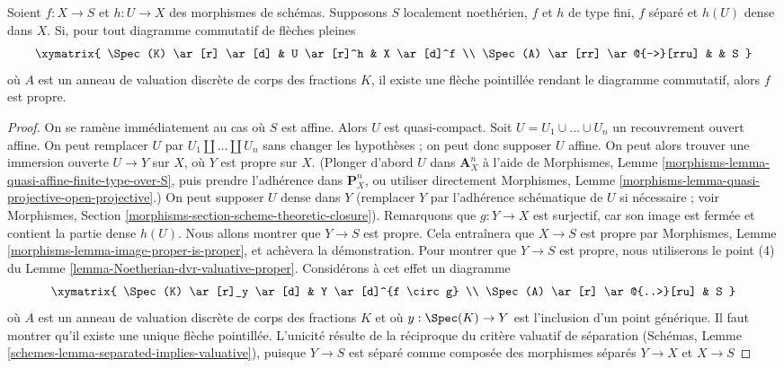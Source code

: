 \begin{lemma}
\label{lemma-refined-valuative-criterion-proper}
Soient $f : X \to S$ et $h : U \to X$ des morphismes de schémas.
Supposons $S$ localement noethérien, $f$ et $h$ de type fini,
$f$ séparé et $h(U)$ dense dans $X$.
Si, pour tout diagramme commutatif de flèches pleines
$$
\xymatrix{
\Spec(K) \ar[r] \ar[d] & U \ar[r]^h & X \ar[d]^f \\
\Spec(A) \ar[rr] \ar@{-->}[rru] & & S
}
$$
où $A$ est un anneau de valuation discrète de corps des fractions $K$,
il existe une flèche pointillée rendant le diagramme commutatif, alors $f$ est propre.
\end{lemma}

\begin{proof}
On se ramène immédiatement au cas où $S$ est affine.
Alors $U$ est quasi-compact.
Soit $U = U_1 \cup \ldots \cup U_n$ un recouvrement ouvert affine.
On peut remplacer $U$ par $U_1 \amalg \ldots \amalg U_n$ sans
changer les hypothèses ; on peut donc supposer $U$ affine.
On peut alors trouver une immersion ouverte $U \to Y$ sur $X$,
où $Y$ est propre sur $X$. (Plonger d'abord $U$ dans $\mathbf{A}^n_X$
à l'aide de Morphismes, Lemme \ref{morphisms-lemma-quasi-affine-finite-type-over-S},
puis prendre l'adhérence dans $\mathbf{P}^n_X$, ou utiliser directement
Morphismes, Lemme \ref{morphisms-lemma-quasi-projective-open-projective}.)
On peut supposer $U$ dense dans $Y$ (remplacer $Y$ par l'adhérence schématique
de $U$ si nécessaire ; voir Morphismes, Section
\ref{morphisms-section-scheme-theoretic-closure}).
Remarquons que $g : Y \to X$ est surjectif, car son image est fermée
et contient la partie dense $h(U)$.
Nous allons montrer que $Y \to S$ est propre. Cela entraînera que
$X \to S$ est propre par
Morphismes, Lemme \ref{morphisms-lemma-image-proper-is-proper},
et achèvera la démonstration.
Pour montrer que $Y \to S$ est propre, nous utiliserons
le point (4) du Lemme \ref{lemma-Noetherian-dvr-valuative-proper}.
Considérons à cet effet un diagramme
$$
\xymatrix{
\Spec(K) \ar[r]_y \ar[d] & Y \ar[d]^{f \circ g} \\
\Spec(A) \ar[r] \ar@{..>}[ru] & S
}
$$
où $A$ est un anneau de valuation discrète de corps des fractions $K$
et où $y : \Spec(K) \to Y$ est l'inclusion d'un point générique.
Il faut montrer qu'il existe une unique flèche pointillée.
L'unicité résulte de la réciproque du critère valuatif
de séparation
(Schémas, Lemme \ref{schemes-lemma-separated-implies-valuative}),
puisque $Y \to S$ est séparé comme
composée des morphismes séparés $Y \to X$ et $X \to S$

\end{proof}
